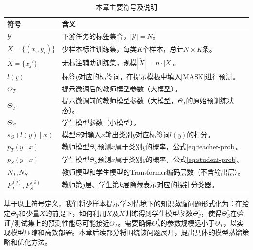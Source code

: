 \documentclass[../main.tex]{subfiles}
\begin{document}
\begin{table}[htbp]
	\centering
	\caption{本章主要符号及说明}
	\label{tab:ch3-notation}
	\small\begin{tabular}{ll}
		\toprule[1pt]
		符号                       & 含义                                                       \\
		\midrule[0.5pt]
		$\mathcal{Y}$            & 下游任务的标签集合，$|\mathcal{Y}|=N$。                             \\
		$X = \{(x_i, y_i)\}$     & 少样本标注训练集，每类$K$个样本，总计$N \times K$条。                       \\
		$\tilde{X} = \{x_j'\}$   & 无标注辅助训练集，规模$|\tilde{X}| = n \cdot |X|$。                  \\
		$l(y)$                   & 标签$y$对应的标签词，在提示模板中填入[MASK]进行预测。                          \\
		$\Theta_T$               & 提示微调后的教师模型参数（大模型）。                                       \\
		$\Theta_{T'}$            & 提示微调前的教师模型参数（大模型，$\Theta_T$的原始预训练状态）。                    \\
		$\Theta_S$               & 学生模型参数（小模型）。                                             \\
		$s_{\Theta}(l(y)\mid x)$ & 模型$\Theta$对输入$x$输出类别$y$对应标签词$l(y)$的打分。                   \\
		$p_T(y\mid x)$           & 教师模型$\Theta_T$预测$x$属于类别$y$的概率，公式\eqref{eq:teacher-prob}。 \\
		$p_S(y\mid x)$           & 学生模型$\Theta_S$预测$x$属于类别$y$的概率，公式\eqref{eq:student-prob}。 \\
		$N_T, N_S$               & 教师模型和学生模型的Transformer编码层数（不含输出层）。                        \\
		$P_T^{(j)}, P_S^{(k)}$   & 教师第$j$层、学生第$k$层隐藏表示对应的探针分类器。                             \\
		\bottomrule[1pt]
	\end{tabular}
\end{table}

基于以上符号定义，我们将少样本提示学习情境下的知识蒸馏问题形式化为：在给定$\Theta_T$和少量$X$的前提下，如何利用$X$及$\tilde{X}$训练得到学生模型参数$\Theta_S^*$，使得$\Theta_S^*$在验证/测试集上的预测性能尽可能接近$\Theta_T$。需要确保$\Theta_S^*$的参数规模远小于$\Theta_T$，以实现模型压缩和高效部署。本章后续部分将围绕该问题展开，提出具体的模型蒸馏策略和优化方法。
\end{document}
